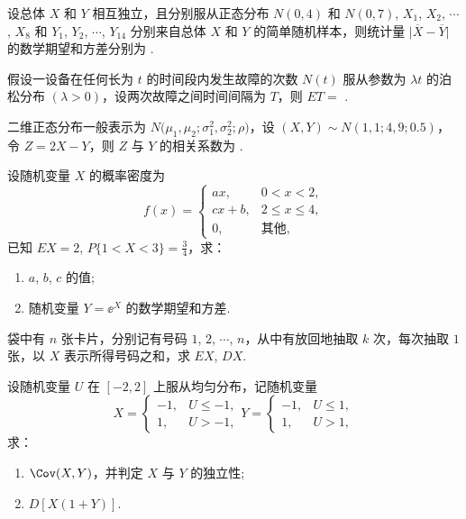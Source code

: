 	\begin{titwo}
		设总体 $X$ 和 $Y$ 相互独立，且分别服从正态分布 $N(0,4)$ 和 $N(0,7)$, $X_{1}$, $X_{2}$, $\cdots$, $X_{8}$ 和 $Y_{1}$, $Y_{2}$, $\cdots$, $Y_{14}$ 分别来自总体 $X$ 和 $Y$ 的简单随机样本，则统计量 $\bigl| \overline{X} - \overline{Y} \bigr|$ 的数学期望和方差分别为 \htwo.
	\end{titwo}

	\begin{titwo}
		假设一设备在任何长为 $t$ 的时间段内发生故障的次数 $N(t)$ 服从参数为 $\lambda t$ 的泊松分布 $(\lambda > 0)$，设两次故障之间时间间隔为 $T$，则 $ET = $ \htwo.
	\end{titwo}

	\begin{titwo}
		二维正态分布一般表示为 $N \bigl( \mu_{1},\allowbreak \mu_{2};\allowbreak \sigma_{1}^{2},\allowbreak \sigma_{2}^{2};\allowbreak \rho \bigr)$，设 $(X,Y) \sim N(1,1;4,9;0.5)$，令 $Z = 2X - Y$，则 $Z$ 与 $Y$ 的相关系数为 \htwo.
	\end{titwo}

	\begin{titwo}
		设随机变量 $X$ 的概率密度为
		\[
			f(x) = \begin{cases}
				ax, & 0 < x < 2, \\
				cx + b, & 2 \leq x \leq 4, \\
				0, & \text{其他},
			\end{cases}
		\]
		已知 $EX = 2$, $P\{1 < X < 3\} = \frac{3}{4}$，求：
		\begin{enumerate}
			\item $a$, $b$, $c$ 的值;
			\item 随机变量 $Y = \ee^{X}$ 的数学期望和方差.
		\end{enumerate}
	\end{titwo}

	\begin{titwo}
		袋中有 $n$ 张卡片，分别记有号码 $1$, $2$, $\cdots$, $n$，从中有放回地抽取 $k$ 次，每次抽取 $1$ 张，以 $X$ 表示所得号码之和，求 $EX$, $DX$.
	\end{titwo}

	\begin{titwo}
		设随机变量 $U$ 在 $[-2,2]$ 上服从均匀分布，记随机变量
		\[
			X = \begin{cases}
				-1, & U \leq -1, \\
				1, & U > -1,
			\end{cases}
			Y = \begin{cases}
				-1, & U \leq 1, \\
				1, & U > 1,
			\end{cases}
		\]
		求：
		\begin{enumerate}
			\item $\Cov(X,Y)$，并判定 $X$ 与 $Y$ 的独立性;
			\item $D[X(1 + Y)]$.
		\end{enumerate}
	\end{titwo}

